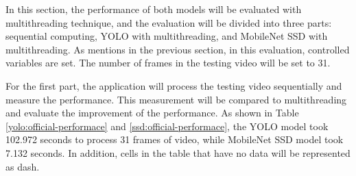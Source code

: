             In this section, the performance of both models will be evaluated with multithreading technique,
            and the evaluation will be divided into three parts: sequential computing, YOLO with multithreading, and MobileNet SSD with multithreading.
            As mentions in the previous section, in this evaluation, controlled variables are set.
            The number of frames in the testing video will be set to 31.

            For the first part, the application will process the testing video sequentially and measure the performance.
            This measurement will be compared to multithreading and evaluate the improvement of the performance.
            As shown in Table \ref{yolo:official-performace} and \ref{ssd:official-performace},
            the YOLO model took 102.972 seconds to process 31 frames of video, while MobileNet SSD model took 7.132 seconds.
            In addition, cells in the table that have no data will be represented as dash.

